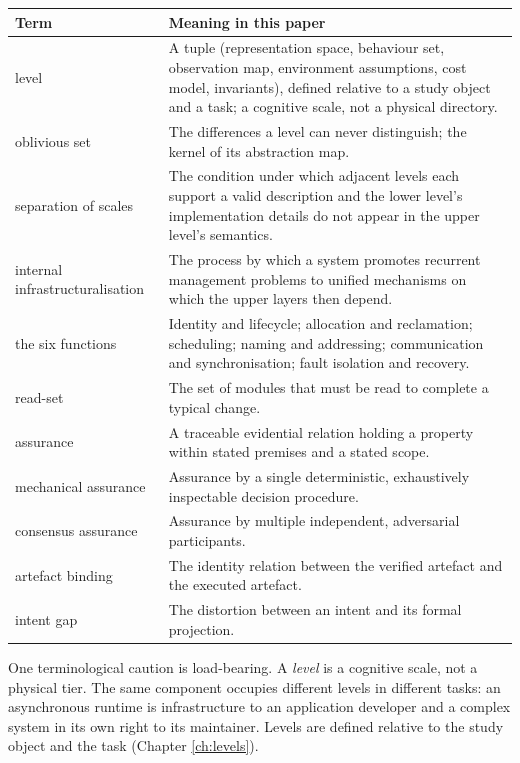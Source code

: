 \begin{longtable}{L{3.1cm}L{11.4cm}}
\toprule
\textbf{Term} & \textbf{Meaning in this paper} \\
\midrule
\endhead
level & A tuple (representation space, behaviour set, observation map, environment
  assumptions, cost model, invariants), defined relative to a study object and a task;
  a cognitive scale, not a physical directory. \\
oblivious set & The differences a level can never distinguish; the kernel of its
  abstraction map. \\
separation of scales & The condition under which adjacent levels each support a valid
  description and the lower level's implementation details do not appear in the upper
  level's semantics. \\
internal infrastructuralisation & The process by which a system promotes recurrent
  management problems to unified mechanisms on which the upper layers then depend. \\
the six functions & Identity and lifecycle; allocation and reclamation; scheduling;
  naming and addressing; communication and synchronisation; fault isolation and recovery. \\
read-set & The set of modules that must be read to complete a typical change. \\
assurance & A traceable evidential relation holding a property within stated premises and
  a stated scope. \\
mechanical assurance & Assurance by a single deterministic, exhaustively inspectable
  decision procedure. \\
consensus assurance & Assurance by multiple independent, adversarial participants. \\
artefact binding & The identity relation between the verified artefact and the executed
  artefact. \\
intent gap & The distortion between an intent and its formal projection. \\
\bottomrule
\end{longtable}

One terminological caution is load-bearing. A \emph{level} is a cognitive scale, not a
physical tier. The same component occupies different levels in different tasks: an
asynchronous runtime is infrastructure to an application developer and a complex system in
its own right to its maintainer. Levels are defined relative to the study object and the
task (Chapter \ref{ch:levels}).
